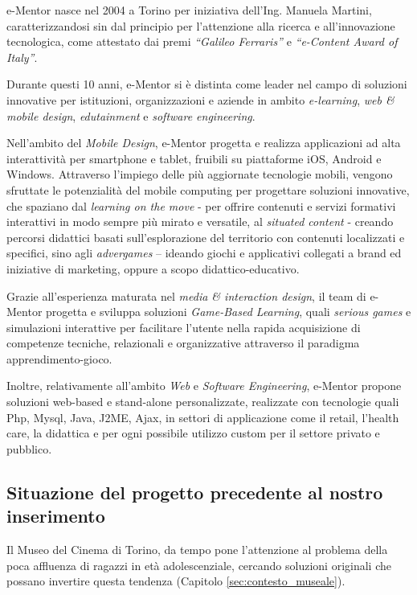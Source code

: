 e-Mentor nasce nel 2004 a Torino per iniziativa dell’Ing. Manuela Martini, caratterizzandosi sin dal principio per l’attenzione alla ricerca e all’innovazione tecnologica, come attestato dai premi \textit{“Galileo Ferraris”} e \textit{“e-Content Award of Italy”}. 

Durante questi 10 anni, e-Mentor si è distinta come leader nel campo di soluzioni innovative per istituzioni, organizzazioni e aziende in ambito \textit{e-learning}, \textit{web \& mobile design}, \textit{edutainment} e \textit{software engineering}.

Nell’ambito del \textit{Mobile Design}, e-Mentor progetta e realizza applicazioni ad alta interattività per smartphone e tablet, fruibili su piattaforme iOS, Android e Windows. Attraverso l’impiego delle più aggiornate tecnologie mobili, vengono sfruttate le potenzialità del mobile computing per progettare soluzioni innovative, che spaziano dal \textit{learning on the move} - per offrire contenuti e servizi formativi interattivi in modo sempre più mirato e versatile, al \textit{situated content} - creando percorsi didattici basati sull'esplorazione del territorio con contenuti localizzati e specifici, sino agli \textit{advergames} – ideando giochi e applicativi collegati a brand ed iniziative di marketing, oppure a scopo didattico-educativo.

Grazie all'esperienza maturata nel \textit{media \& interaction design}, il team di e-Mentor progetta e sviluppa soluzioni \textit{Game-Based Learning}, quali \textit{serious games} e simulazioni interattive per facilitare l'utente nella rapida acquisizione di competenze tecniche, relazionali e organizzative attraverso il paradigma apprendimento-gioco.

Inoltre, relativamente all’ambito \textit{Web} e \textit{Software Engineering}, e-Mentor propone soluzioni web-based e stand-alone personalizzate, realizzate con tecnologie quali Php, Mysql, Java, J2ME, Ajax, in settori di applicazione come il retail, l’health care, la didattica e per ogni possibile utilizzo custom per il settore privato e pubblico.

\subsection{Situazione del progetto precedente al nostro inserimento}
\label{sec:azienda_precedente}

Il Museo del Cinema di Torino, da tempo pone l’attenzione al problema della poca affluenza di ragazzi in età adolescenziale, cercando soluzioni originali che possano invertire questa tendenza (Capitolo \ref{sec:contesto_museale}).

